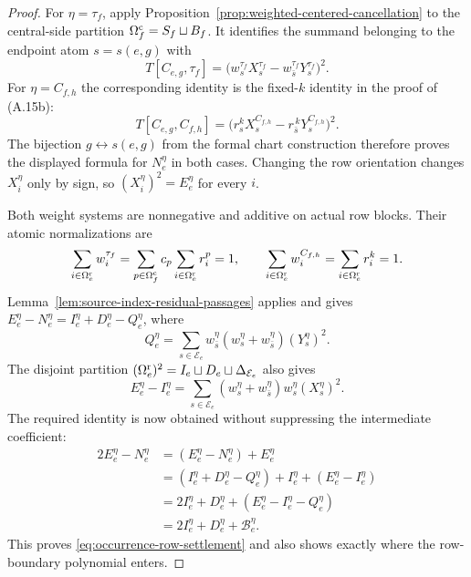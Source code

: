 \documentclass[11pt]{article}
\begin{document}
\begin{proof}
For $\eta=\tau_f$, apply
Proposition~\ref{prop:weighted-centered-cancellation} to the central-side
partition $\Omega_f^{\rm c}=S_f\sqcup B_f$.  It identifies the summand
belonging to the endpoint atom $s=s(e,g)$ with
\[
 T[C_{e,g},\tau_f]
 =\bigl(w_s^{\tau_f}X_s^{\tau_f}
       -w_{\bar s}^{\tau_f}Y_s^{\tau_f}\bigr)^2.
\]
For $\eta=C_{f,h}$ the corresponding identity is the fixed-$k$ identity in
the proof of (A.15b):
\[
 T[C_{e,g},C_{f,h}]
 =\bigl(r_s^kX_s^{C_{f,h}}
       -r_{\bar s}^{\,k}Y_s^{C_{f,h}}\bigr)^2.
\]
The bijection $g\leftrightarrow s(e,g)$ from the formal chart construction
therefore proves the displayed formula for $N_e^\eta$ in both cases.
Changing the row orientation changes $X_i^\eta$ only by sign, so
$(X_i^\eta)^2=E_e^\eta$ for every $i$.

Both weight systems are nonnegative and additive on actual row blocks.
Their atomic normalizations are
\[
 \sum_{i\in\Omega_e^{\rm r}}w_i^{\tau_f}
 =\sum_{p\in\Omega_f^{\rm c}}c_p
   \sum_{i\in\Omega_e^{\rm r}}r_i^p=1,
 \qquad
 \sum_{i\in\Omega_e^{\rm r}}w_i^{C_{f,h}}
 =\sum_{i\in\Omega_e^{\rm r}}r_i^k=1.
\]
Lemma~\ref{lem:source-index-residual-passages} applies and gives
$E_e^\eta-N_e^\eta=I_e^\eta+D_e^\eta-Q_e^\eta$, where
\[
 Q_e^\eta=\sum_{s\in\mathcal E_e}
 w_{\bar s}^\eta(w_s^\eta+w_{\bar s}^\eta)(Y_s^\eta)^2.
\]
The disjoint partition
$(\Omega_e^{\rm r})^2=I_e\sqcup D_e\sqcup\Delta_{\mathcal E_e}$
also gives
\[
E_e^\eta-I_e^\eta
=\sum_{s\in\mathcal E_e}
 (w_s^\eta+w_{\bar s}^\eta)w_s^\eta(X_s^\eta)^2.
\]
The required identity is now obtained without suppressing the intermediate
coefficient:
\[
\begin{aligned}
2E_e^\eta-N_e^\eta
&=(E_e^\eta-N_e^\eta)+E_e^\eta\\
&=(I_e^\eta+D_e^\eta-Q_e^\eta)
  +I_e^\eta+(E_e^\eta-I_e^\eta)\\
&=2I_e^\eta+D_e^\eta
  +(E_e^\eta-I_e^\eta-Q_e^\eta)\\
&=2I_e^\eta+D_e^\eta+\mathcal B_e^\eta.
\end{aligned}
\]
This proves \eqref{eq:occurrence-row-settlement} and also shows exactly where
the row-boundary polynomial enters.


\end{proof}
\end{document}
